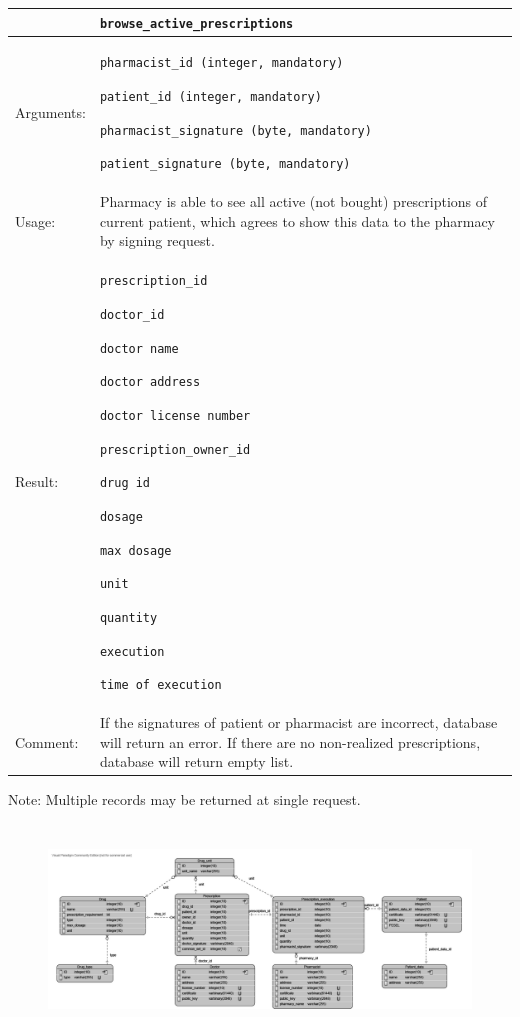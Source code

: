     \begin{longtable}{| p{3cm} | p{10.75cm} |}
    \hline
     & \texttt{browse\_active\_prescriptions} \\ \hline
    Arguments: &  \begin{packed_enum}
    	\item \texttt{pharmacist\_id (integer, mandatory)}
		\item \texttt{patient\_id (integer, mandatory)}
		\item \texttt{pharmacist\_signature (byte, mandatory)}
		\item \texttt{patient\_signature (byte, mandatory)}
	\end{packed_enum}     \\ \hline
    Usage: & Pharmacy is able to see all active (not bought) prescriptions of current patient, which agrees to show this data to the pharmacy by signing request. \\ \hline
    Result: & \begin{packed_enum}
    	\item \texttt{prescription\_id}
    	\item \texttt{doctor\_id}
    	\item \texttt{doctor name}
    	\item \texttt{doctor address}
    	\item \texttt{doctor license number}
    	\item \texttt{prescription\_owner\_id}
    	\item \texttt{drug id}
    	\item \texttt{dosage}
    	\item \texttt{max dosage}
    	\item \texttt{unit}
    	\item \texttt{quantity}
    	\item \texttt{execution}
    	\item \texttt{time of execution}
	\end{packed_enum}     \\ \hline	
		Comment: & If the signatures of patient or pharmacist are incorrect, database will return an error. If there are no non-realized prescriptions, database will return empty list.\\ \hline
    \end{longtable}
Note: Multiple records may be returned at single request.
\normalsize
\newpage
\section{}

\begin{figure}[h]
\begin{center}
\includegraphics[width=1.07\textwidth, height=0.5\textheight , angle=90]{database/databaseSchema.png}
\end{center}
\end{figure} 
